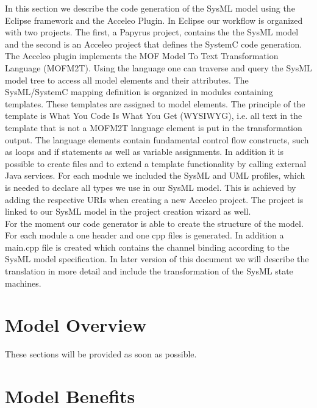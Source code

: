 \documentclass{template/openetcs_article}
\begin{document}
In this section we describe the code generation of the SysML model using the Eclipse framework and the Acceleo Plugin.
In Eclipse our workflow is organized with two projects. The first, a Papyrus project, contains the the SysML model and the second is an Acceleo project that defines the SystemC code generation. The Acceleo plugin implements the MOF Model To Text Transformation Language (MOFM2T). Using the language one can traverse and query the SysML model tree to access all model elements and their attributes. The SysML/SystemC mapping definition is organized in modules containing templates. These templates are assigned to model elements. The principle of the template is What You Code Is What You Get (WYSIWYG), i.e. all text in the template that is not a MOFM2T language element is put in the transformation output. The language elements contain fundamental control flow constructs, such as loops and if statements as well as variable assignments. In addition it is possible to create files and to extend a template functionality by calling external Java services. For each module we included the SysML and UML profiles, which is needed to declare all types we use in our SysML model. This is achieved by adding the respective URIs when creating a new Acceleo project. The project is linked to our SysML model in the project creation wizard as well.\\

For the moment our code generator is able to create the structure of the model. For each module a one header and one cpp files is generated. In addition a main.cpp file is created which contains the channel binding according to the SysML model specification. In later version of this document we will describe the translation in more detail and include the transformation of the SysML state machines.


\section{Model Overview}
\label{sec:model-overview}

These sections will be provided as soon as possible.


\section{Model Benefits}
\label{sec:model-highlights}
\end{document}
